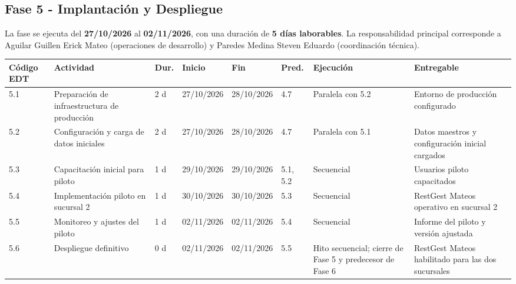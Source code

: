\documentclass[12pt,a4paper]{article}
\begin{document}
\begin{landscape}
\subsection{Fase 5 - Implantación y Despliegue}

La fase se ejecuta del \textbf{27/10/2026} al \textbf{02/11/2026}, con una duración de \textbf{5 días laborables}. 
La responsabilidad principal corresponde a Aguilar Guillen Erick Mateo (operaciones de desarrollo) y Paredes Medina Steven Eduardo (coordinación técnica).

\begin{center}
\setlength{\tabcolsep}{3pt}
\renewcommand{\arraystretch}{1.15}
\fontsize{7.2}{8.5}\selectfont
\begin{tabularx}{\linewidth}{|p{0.85cm}|p{4.0cm}|p{0.75cm}|p{1.45cm}|p{1.45cm}|p{1.4cm}|p{4.0cm}|X|}
\hline
\rowcolor{tableheader}
\textbf{Código EDT} & \textbf{Actividad} & \textbf{Dur.} & \textbf{Inicio} & \textbf{Fin} & \textbf{Pred.} & \textbf{Ejecución} & \textbf{Entregable} \\ \hline
5.1 & Preparación de infraestructura de producción & 2 d & 27/10/2026 & 28/10/2026 & 4.7 & Paralela con 5.2 & Entorno de producción configurado \\ \hline
5.2 & Configuración y carga de datos iniciales & 2 d & 27/10/2026 & 28/10/2026 & 4.7 & Paralela con 5.1 & Datos maestros y configuración inicial cargados \\ \hline
5.3 & Capacitación inicial para piloto & 1 d & 29/10/2026 & 29/10/2026 & 5.1, 5.2 & Secuencial & Usuarios piloto capacitados \\ \hline
5.4 & Implementación piloto en sucursal 2 & 1 d & 30/10/2026 & 30/10/2026 & 5.3 & Secuencial & RestGest Mateos operativo en sucursal 2 \\ \hline
5.5 & Monitoreo y ajustes del piloto & 1 d & 02/11/2026 & 02/11/2026 & 5.4 & Secuencial & Informe del piloto y versión ajustada \\ \hline
5.6 & Despliegue definitivo & 0 d & 02/11/2026 & 02/11/2026 & 5.5 & Hito secuencial; cierre de Fase 5 y predecesor de Fase 6 & RestGest Mateos habilitado para las dos sucursales \\ \hline
\end{tabularx}
\end{center}
\end{landscape}
\end{document}
